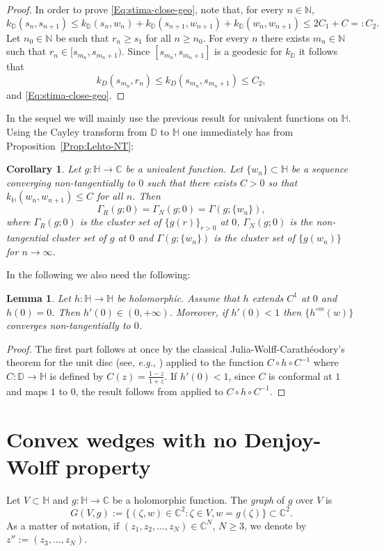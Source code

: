 \documentclass[12pt]{amsart}
\newtheorem{lemma}[theorem]{Lemma}
\newtheorem{corollary}[theorem]{Corollary}
\theoremstyle{definition}
\theoremstyle{remark}
\numberwithin{equation}{section}
\def\C{\mathbb C}
\def\D{\mathbb D}
\def\Ha{\mathbb H}
\begin{document}
\begin{proof}
In order to prove \eqref{Eq:stima-close-geo}, note that, for every $n\in \mathbb N$,
\[
k_\D(s_n,s_{n+1})\leq k_\D(s_n,w_n)+k_\D(s_{n+1},w_{n+1})+k_\D(w_n,w_{n+1})\leq 2C_1+C=:C_2.
\]
Let {$n_0\in\mathbb N$} be such that $r_n\geq s_1$ for all $n\geq n_0$. For every $n$ there exists $m_n\in \mathbb N$ such that $r_n\in [s_{m_n}, s_{m_n+1})$. Since $[s_{m_n}, s_{m_n+1}]$ is a geodesic for $k_\D$ it follows that
\[
k_D(s_{m_n}, r_n)\leq k_D(s_{m_n}, s_{m_n+1})\leq C_2,
\]
and \eqref{Eq:stima-close-geo}.  
\end{proof}

In the sequel we will mainly use the previous result for univalent functions on $\Ha$. Using the Cayley transform from $\D$ to $\Ha$ one immediately has from Proposition~\ref{Prop:Lehto-NT}:

\begin{corollary}\label{Cor:non-tg-inH}
Let $g:\Ha \to \C$ be a univalent function. Let $\{w_n\}\subset\Ha$ be a sequence converging non-tangentially to $0$ such that there exists $C>0$ so that $k_\Ha(w_n,w_{n+1})\leq C$ for all $n$. Then
\[
\Gamma_{R}(g;0)=\Gamma_{N}(g;0)=\Gamma(g;\{w_n\}),
\]
where $\Gamma_{R}(g;0)$ is the cluster set of $\{g(r)\}_{r>0}$ at $0$, $\Gamma_{N}(g;0)$ is the non-tangential cluster set of $g$ at $0$ and $\Gamma(g;\{w_n\})$ is the cluster set of $\{g(w_n)\}$ for $n\to \infty$.
\end{corollary}

In the following we also need the following:
\begin{lemma}\label{lem:JWC}
Let $h:\Ha \to \Ha$ be holomorphic. Assume that $h$ extends $C^1$ at $0$ and $h(0)=0$. Then $h'(0)\in (0,+\infty)$. Moreover, if $h'(0)<1$ then $\{h^{\circ m}(w)\}$ converges non-tangentially to $0$. 
\end{lemma} 
\begin{proof}
The first part follows at once by the classical Julia-Wolff-Carath\'eodory's theorem for the unit disc (see, {\sl e.g.}, \cite[Theorem~1.7.3]{BCDM}) applied to the function $C\circ h\circ C^{-1}$  where $C:\D\to \Ha$ is defined by $C(z)=\frac{1-z}{1+z}$. If $h'(0)<1$, since $C$ is conformal at $1$ and maps $1$ to $0$, the result follows from \cite[Proposition~1.8.7]{BCDM} applied to $C\circ h\circ C^{-1}$.
\end{proof}

\section{Convex wedges with no Denjoy-Wolff property}\label{Sec:3}
Let $V \subset \Ha$ and $g:\mathbb H \to \C$ be a  holomorphic function. The \emph{graph} of $g$ over $V$ is 
\[
G(V, g):=\{(\zeta,w)\in\mathbb C^2: \zeta \in V, w=g(\zeta)\}\subset \C^2.
\]
As a matter of notation, if $(z_1,z_2,\ldots, z_N)\in \C^N$, $N\geq 3$, we denote by $z'':=(z_3,\ldots, z_N)$.
\end{document}
